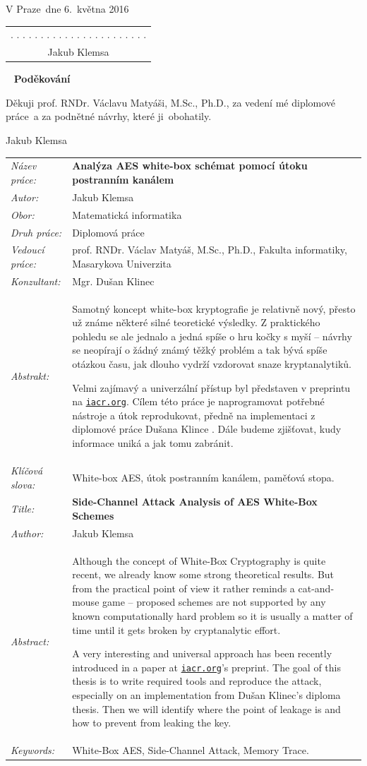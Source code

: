 \documentclass[11pt,a4paper,twoside,openright]{report}
\theoremstyle{definition}
\theoremstyle{remark}
\newcommand{\link}[1]{\href{http://#1}{\tt #1}}
\newcommand{\obor}{Matematická informatika}
\newcommand{\TypPrace}{Diplomová práce}
\newcommand{\mePrace}{mé diplomové práce}
\newcommand{\kohoCoPraci}{ji}
\newcommand{\nazevcz}{Analýza AES white-box schémat pomocí útoku postranním kanálem}
\newcommand{\nazeven}{Side-Channel Attack Analysis of AES White-Box Schemes}
\newcommand{\autor}{Jakub Klemsa}
\newcommand{\vedouci}{prof. RNDr. Václav Matyáš, M.Sc., Ph.D.}
\newcommand{\vedoucimu}{prof. RNDr. Václavu Matyáši, M.Sc., Ph.D.}
\newcommand{\pracovisteVed}{Fakulta informatiky, Masarykova Univerzita}
\newcommand{\konzultant}{Mgr. Dušan Klinec}
\newcommand{\VMiste}{V Praze}
\newcommand{\klicova}{White-box AES, útok postranním kanálem, paměťová stopa.}
\newcommand{\keyword}{White-Box AES, Side-Channel Attack, Memory Trace.}
\newcommand{\abstrCZ}{Samotný koncept white-box kryptografie je relativně nový, přesto už známe některé silné teoretické výsledky. Z praktického pohledu se ale jednalo a jedná spíše o hru kočky s myší -- návrhy se neopírají o žádný známý těžký problém a tak bývá spíše otázkou času, jak dlouho vydrží vzdorovat snaze kryptanalytiků.

Velmi zajímavý a univerzální přístup \cite{bos2015differential} byl představen v preprintu na \link{iacr.org}. Cílem této práce je naprogramovat potřebné nástroje a útok reprodukovat, předně na implementaci z diplomové práce Dušana Klince \cite{klinec2013white}. Dále budeme zjišťovat, kudy informace uniká a jak tomu zabránit.}
\newcommand{\abstrEN}{Although the concept of White-Box Cryptography is quite recent, we already know some strong theoretical results. But from the practical point of view it rather reminds a cat-and-mouse game -- proposed schemes are not supported by any known computationally hard problem so it is usually a matter of time until it gets broken by cryptanalytic effort.

A very interesting and universal approach has been recently introduced in a paper \cite{bos2015differential} at \link{iacr.org}'s preprint. The goal of this thesis is to write required tools and reproduce the attack, especially on an implementation from Dušan Klinec's diploma thesis. Then we will identify where the point of leakage is and how to prevent from leaking the key.}
\begin{document}
\begin{titlepage}
	\noindent
	\vspace{5mm}\VMiste ~dne 6.\ kv\v{e}tna 2016\hfill
		\begin{tabular}{c}
		. . . . . . . . . . . . . . . . . . . . . . .\\
		\autor
		\end{tabular}
	\cleardoublepage
	
	
	\thispagestyle{empty}
	~
	\vfill
	\noindent\textbf{Poděkování}
	\vspace{0.5cm}
	
	\noindent
	Děkuji \vedoucimu, za vedení \mePrace ~a za podnětné návrhy, které \kohoCoPraci ~obohatily.
	
	\begin{flushright}
	\autor
	\end{flushright}
	\cleardoublepage
	
	
	\thispagestyle{empty}
	\begin{tabularx}{\textwidth}{lX}
		{\em Název práce:} & \bf \nazevcz \\[4mm]
		{\em Autor:} & \autor \\[4mm]
		{\em Obor:} & \obor \\[4mm]
		{\em Druh práce:} & \TypPrace \\[4mm]
		{\em Vedoucí práce:} & \vedouci, \pracovisteVed \\[4mm]
		{\em Konzultant:} & \konzultant \\[4mm]
		{\em Abstrakt:} & \abstrCZ \\[4mm]
		{\em Klíčová slova:} & \klicova \\[20mm]
		
		{\em Title:} & \bf \nazeven \\[4mm]
		{\em Author:} & \autor \\[4mm]
		{\em Abstract:} & \abstrEN \\[4mm]
		{\em Keywords:} & \keyword
	\end{tabularx}
	\cleardoublepage
	
	
	\thispagestyle{empty}
	\tableofcontents
	\cleardoublepage
	
	
	\thispagestyle{empty}
	\printnomenclature
	\cleardoublepage
	
\end{titlepage}



		
\end{document}
